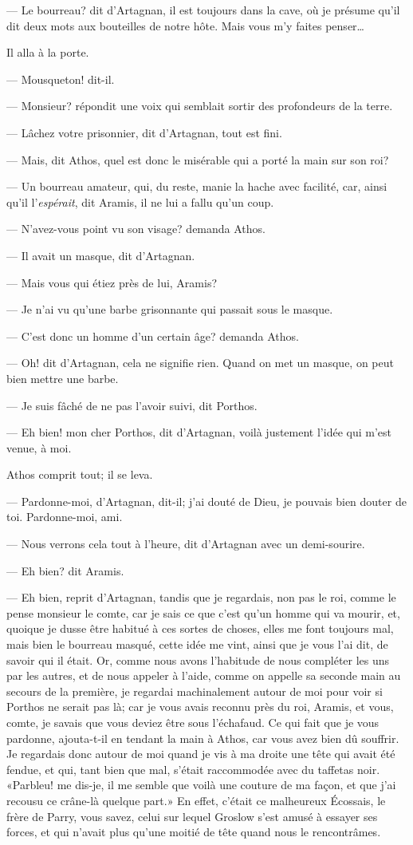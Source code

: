 — Le bourreau? dit d'Artagnan, il est toujours dans la cave, où je présume qu'il dit deux mots aux bouteilles de notre hôte. Mais vous m'y faites penser\dots

Il alla à la porte.

— Mousqueton! dit-il.

— Monsieur? répondit une voix qui semblait sortir des profondeurs de la terre.

— Lâchez votre prisonnier, dit d'Artagnan, tout est fini.

— Mais, dit Athos, quel est donc le misérable qui a porté la main sur son roi?

— Un bourreau amateur, qui, du reste, manie la hache avec facilité, car, ainsi qu'il l'\textit{espérait}, dit Aramis, il ne lui a fallu qu'un coup.

— N'avez-vous point vu son visage? demanda Athos.

— Il avait un masque, dit d'Artagnan.

— Mais vous qui étiez près de lui, Aramis?

— Je n'ai vu qu'une barbe grisonnante qui passait sous le masque.

— C'est donc un homme d'un certain âge? demanda Athos.

— Oh! dit d'Artagnan, cela ne signifie rien. Quand on met un masque, on peut bien mettre une barbe.

— Je suis fâché de ne pas l'avoir suivi, dit Porthos.

— Eh bien! mon cher Porthos, dit d'Artagnan, voilà justement l'idée qui m'est venue, à moi.

Athos comprit tout; il se leva.

— Pardonne-moi, d'Artagnan, dit-il; j'ai douté de Dieu, je pouvais bien douter de toi. Pardonne-moi, ami.

— Nous verrons cela tout à l'heure, dit d'Artagnan avec un demi-sourire.

— Eh bien? dit Aramis.

— Eh bien, reprit d'Artagnan, tandis que je regardais, non pas le roi, comme le pense monsieur le comte, car je sais ce que c'est qu'un homme qui va mourir, et, quoique je dusse être habitué à ces sortes de choses, elles me font toujours mal, mais bien le bourreau masqué, cette idée me vint, ainsi que je vous l'ai dit, de savoir qui il était. Or, comme nous avons l'habitude de nous compléter les uns par les autres, et de nous appeler à l'aide, comme on appelle sa seconde main au secours de la première, je regardai machinalement autour de moi pour voir si Porthos ne serait pas là; car je vous avais reconnu près du roi, Aramis, et vous, comte, je savais que vous deviez être sous l'échafaud. Ce qui fait que je vous pardonne, ajouta-t-il en tendant la main à Athos, car vous avez bien dû souffrir. Je regardais donc autour de moi quand je vis à ma droite une tête qui avait été fendue, et qui, tant bien que mal, s'était raccommodée avec du taffetas noir. «Parbleu! me dis-je, il me semble que voilà une couture de ma façon, et que j'ai recousu ce crâne-là quelque part.» En effet, c'était ce malheureux Écossais, le frère de Parry, vous savez, celui sur lequel Groslow s'est amusé à essayer ses forces, et qui n'avait plus qu'une moitié de tête quand nous le rencontrâmes.

